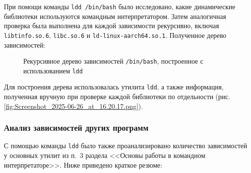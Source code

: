 При помощи команды \texttt{ldd /bin/bash} было исследовано, какие динамические библиотеки используются командным интерпретатором. Затем аналогичная проверка была выполнена для каждой зависимости рекурсивно, включая \texttt{libtinfo.so.6}, \texttt{libc.so.6} и \texttt{ld-linux-aarch64.so.1}. Полученное дерево зависимостей:

\usetikzlibrary{trees}

\begin{figure}[H]
\centering
{}
\caption{Рекурсивное дерево зависимостей \texttt{/bin/bash}, построенное с использованием \texttt{ldd}}
\label{fig:bash-ldd-tree}
\end{figure}

Для построения дерева использовалась утилита \texttt{ldd}, а также информация, полученная вручную при проверке каждой библиотеки по отдельности (рис. \ref{fig:Screenshot_2025-06-26_at_16.20.17.png}).


\subsubsection{Анализ зависимостей других программ}

С помощью команды \texttt{ldd} было также проанализировано количество зависимостей у основных утилит из п.~3 раздела <<Основы работы в командном интерпретаторе>>. Ниже приведено краткое резюме:


